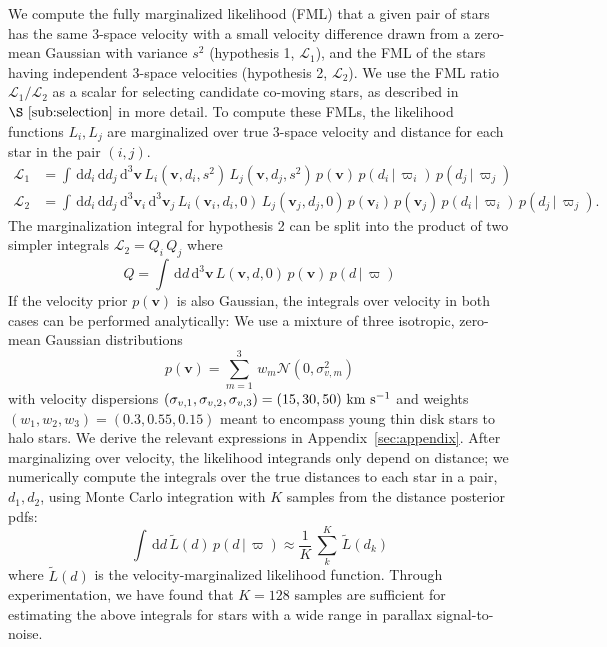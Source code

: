 \documentclass[manuscript, letterpaper]{aastex6}
\newcommand{\given}{\,|\,}
\newcommand{\dd}{\mathrm{d}}
\newcommand{\bs}[1]{\boldsymbol{#1}}
\renewcommand{\vec}[1]{\bs{#1}}
\newcommand{\kms}{\ensuremath{\rm km~s^{-1}}}
\begin{document}
We compute the fully marginalized likelihood (FML) that a given pair of stars
has the same 3-space velocity with a small velocity difference drawn from a
zero-mean Gaussian with variance $s^2$ (hypothesis 1, $\mathcal{L}_1$), and
the FML of the stars having independent 3-space velocities (hypothesis 2,
$\mathcal{L}_2$).
We use the FML ratio $\mathcal{L}_1/\mathcal{L}_2$ as a scalar for selecting
candidate co-moving stars, as described in $\S~\ref{sub:selection}$ in more detail.
To compute these FMLs, the likelihood functions $L_i, L_j$ are marginalized
over true 3-space velocity and distance for each star in the pair $(i,j)$.
\begin{align}
  \mathcal{L}_1 &=
    \int \, \dd d_i \, \dd d_j \, \dd^3 \vec{v} \,
    L_i(\vec{v}, d_i, s^2) \,
    L_j(\vec{v}, d_j, s^2) \,
    p(\vec{v}) \, p(d_i \given \varpi_i) \, p(d_j \given \varpi_j) \\
  \mathcal{L}_2 &=
    \int \, \dd d_i \, \dd d_j \, \dd^3 \vec{v}_i \, \dd^3 \vec{v}_j \,
    L_i(\vec{v}_i, d_i, 0) \,
    L_j(\vec{v}_j, d_j, 0) \,
    p(\vec{v}_i) \, p(\vec{v}_j) \, p(d_i \given \varpi_i) \, p(d_j \given \varpi_j). \label{eq:hyp2}
\end{align}
The marginalization integral for hypothesis 2 can be split into the product of
two simpler integrals $\mathcal{L}_2 = Q_i \, Q_j$ where
\begin{equation}
  Q = \int \, \dd d \, \dd^3 \vec{v} \, L(\vec{v}, d, 0) \, p(\vec{v}) \, p(d\given\varpi)
\end{equation}
If the velocity prior $p(\vec{v})$ is also Gaussian, the integrals over velocity
in both cases can be performed analytically:
We use a mixture of three isotropic, zero-mean Gaussian distributions
\begin{equation}
  p(\vec{v}) = \sum_{m=1}^3 \, w_m \mathcal{N}(0, \sigma_{v,m}^2)
\end{equation}
with velocity dispersions $(\sigma_{v,1}, \sigma_{v,2}, \sigma_{v,3}) = (15, 30, 50)
~\kms$ and weights $(w_1,w_2,w_3) = (0.3, 0.55, 0.15)$
meant to encompass young thin disk stars to halo stars.
We derive the relevant expressions in Appendix~\ref{sec:appendix}.
After marginalizing over velocity, the likelihood integrands only depend on
distance; we numerically compute the integrals over the true distances to each
star in a pair, $d_1,d_2$, using Monte Carlo integration with $K$ samples from
the distance posterior pdfs:
\begin{equation}
  \int \, \dd d \, \tilde{L}(d) \, p(d\given\varpi) \approx
    \frac{1}{K} \, \sum_k^K \, \tilde{L}(d_k)
\end{equation}
where $\tilde{L}(d)$ is the velocity-marginalized likelihood function.
Through experimentation, we have found that $K=128$ samples are sufficient for
estimating the above integrals for stars with a wide range in parallax
signal-to-noise.
\end{document}
